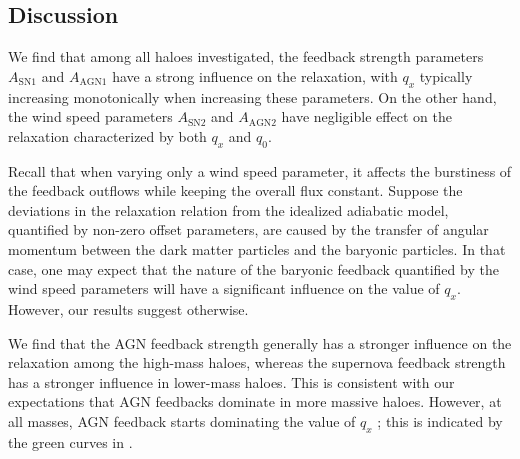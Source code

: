 \subsection*{Discussion}

We find that among all haloes investigated, the feedback strength parameters $A_{\mathrm{SN1}}$ and $A_{\mathrm{AGN1}}$ have a strong influence on the relaxation, with $q_x$ typically increasing monotonically when increasing these parameters. On the other hand, 
the wind speed parameters $A_{\mathrm{SN2}}$ and $A_{\mathrm{AGN2}}$ have negligible effect on the relaxation characterized by both $q_x$ and $q_0$.


Recall that when varying only a wind speed parameter, it affects the burstiness of the feedback outflows while keeping the overall flux constant. Suppose the deviations in the relaxation relation from the idealized adiabatic model, quantified by non-zero offset parameters, are caused by the transfer of angular momentum between the dark matter particles and the baryonic particles. In that case, one may expect that the nature of the baryonic feedback quantified by the wind speed parameters will have a significant influence on the value of $q_x$. However, our results suggest otherwise.

 

We find that the AGN feedback strength generally has a stronger influence on the relaxation among the high-mass haloes, whereas the supernova feedback strength has a stronger influence in lower-mass haloes. This is consistent with our expectations that AGN feedbacks dominate in more massive haloes. However, at all masses, AGN feedback starts dominating the value of $q_x$  ; this is indicated by the green curves in . 

